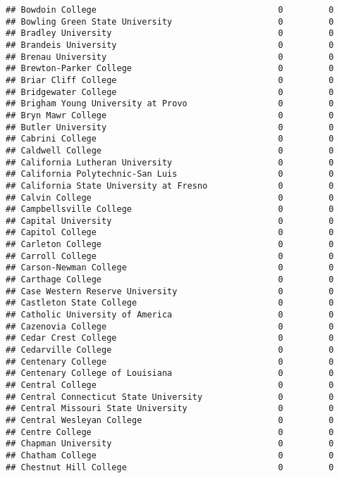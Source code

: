 \documentclass[
]{article}
\begin{document}
\begin{verbatim}
## Bowdoin College                                    0         0
## Bowling Green State University                     0         0
## Bradley University                                 0         0
## Brandeis University                                0         0
## Brenau University                                  0         0
## Brewton-Parker College                             0         0
## Briar Cliff College                                0         0
## Bridgewater College                                0         0
## Brigham Young University at Provo                  0         0
## Bryn Mawr College                                  0         0
## Butler University                                  0         0
## Cabrini College                                    0         0
## Caldwell College                                   0         0
## California Lutheran University                     0         0
## California Polytechnic-San Luis                    0         0
## California State University at Fresno              0         0
## Calvin College                                     0         0
## Campbellsville College                             0         0
## Capital University                                 0         0
## Capitol College                                    0         0
## Carleton College                                   0         0
## Carroll College                                    0         0
## Carson-Newman College                              0         0
## Carthage College                                   0         0
## Case Western Reserve University                    0         0
## Castleton State College                            0         0
## Catholic University of America                     0         0
## Cazenovia College                                  0         0
## Cedar Crest College                                0         0
## Cedarville College                                 0         0
## Centenary College                                  0         0
## Centenary College of Louisiana                     0         0
## Central College                                    0         0
## Central Connecticut State University               0         0
## Central Missouri State University                  0         0
## Central Wesleyan College                           0         0
## Centre College                                     0         0
## Chapman University                                 0         0
## Chatham College                                    0         0
## Chestnut Hill College                              0         0

\end{verbatim}
\end{document}
